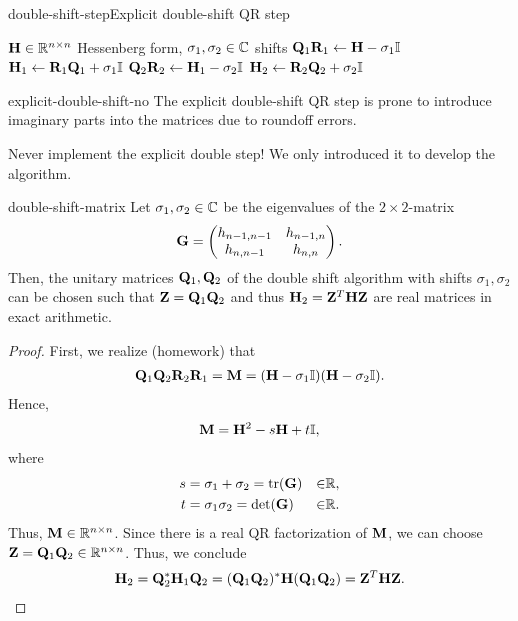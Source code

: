 \begin{Algorithm*}{double-shift-step}{Explicit double-shift QR step}
  \begin{algorithmic}[1]
    \Require $\mathbf H\in\mathbb R^{n\times n}$ Hessenberg form, $\sigma_1,\sigma_2\in\mathbb C$ shifts
    \State $\mathbf Q_1\mathbf R_1 \gets \mathbf H - \sigma_1\mathbb I$ 
    \State $\mathbf H_1 \gets \mathbf R_1\mathbf Q_1 + \sigma_1\mathbb I$
    \State $\mathbf Q_2\mathbf R_2 \gets \mathbf H_1 - \sigma_2\mathbb I$ 
    \State $\mathbf H_2 \gets \mathbf R_2\mathbf Q_2 + \sigma_2\mathbb I$
  \end{algorithmic}
\end{Algorithm*}

\begin{Remark}{explicit-double-shift-no}
  The explicit double-shift QR step is prone to introduce imaginary
  parts into the matrices due to roundoff errors.

  Never implement the explicit double step! We only introduced it to
  develop the algorithm.
\end{Remark}

\begin{Lemma}{double-shift-matrix}
  Let $\sigma_1,\sigma_2\in\mathbb C$ be the eigenvalues of the $2\times2$-matrix
  \begin{gather}
    \mathbf G =
    \begin{pmatrix}
      h_{n-1,n-1}&h_{n-1,n}\\h_{n,n-1}&h_{n,n}
    \end{pmatrix}.
  \end{gather}
  Then, the unitary matrices $\mathbf Q_1,\mathbf Q_2$ of the double shift
  algorithm with shifts $\sigma_1,\sigma_2$ can be chosen such that
  $\mathbf Z = \mathbf Q_1\mathbf Q_2$ and thus $\mathbf H_2 = \mathbf Z^T\mathbf H\mathbf Z$ are
  real matrices in exact arithmetic.
\end{Lemma}

\begin{proof}
  First, we realize (homework) that
  \begin{gather}
    \mathbf Q_1\mathbf Q_2\mathbf R_2\mathbf R_1 = \mathbf M = (\mathbf H-\sigma_1\mathbb I)(\mathbf H-\sigma_2\mathbb I).
  \end{gather}
  Hence,
  \begin{gather}
    \mathbf M = \mathbf H^2-s\mathbf H+t\mathbb I,
  \end{gather}
  where
  \begin{gather}
    \begin{aligned}
      s &= \sigma_1+\sigma_2 = \operatorname{tr}(\mathbf G)&\in&\mathbb R,\\
      t &= \sigma_1\sigma_2 = \det(\mathbf G)&\in&\mathbb R.
    \end{aligned}
  \end{gather}
  Thus, $\mathbf M\in\mathbb R^{n\times n}$. Since there is a real QR factorization of
  $\mathbf M$, we can choose $\mathbf Z = \mathbf Q_1\mathbf Q_2\in\mathbb R^{n\times n}$. Thus, we
  conclude
  \begin{gather}
    \mathbf H_2 = \mathbf Q_2^*\mathbf H_1\mathbf Q_2 = (\mathbf Q_1\mathbf Q_2)^*\mathbf H(\mathbf Q_1\mathbf Q_2) = \mathbf Z^T\mathbf H\mathbf Z.
  \end{gather}
\end{proof}

